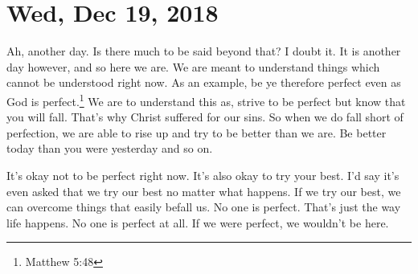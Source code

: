 \section{Wed, Dec 19, 2018}

Ah, another day. Is there much to be said beyond that? I doubt it. It is another day
however, and so here we are. We are meant to understand things which cannot be
understood right now. As an example, be ye therefore perfect even as God is
perfect.\footnote{Matthew 5:48} We are to understand this as, strive to be perfect
but know that you will fall. That's why Christ suffered for our sins. So when we do
fall short of perfection, we are able to rise up and try to be better than we are. Be
better today than you were yesterday and so on.

It's okay not to be perfect right now. It's also okay to try your best. I'd say it's
even asked that we try our best no matter what happens. If we try our best, we can
overcome things that easily befall us. No one is perfect. That's just the way life
happens. No one is perfect at all. If we were perfect, we wouldn't be here.
